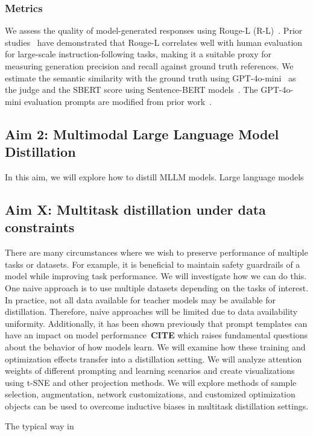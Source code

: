 \subsubsection{Metrics}
We assess the quality of model-generated responses using Rouge-L (R-L)~\cite{lin2004rouge}. 
Prior studies~\cite{wang2022super} have demonstrated that Rouge-L correlates well with human evaluation for large-scale instruction-following tasks, making it a suitable proxy for measuring generation precision and recall against ground truth references.
We estimate the semantic similarity with the ground truth using GPT-4o-mini~\cite{hurst2024gpt} as the judge and the SBERT score using Sentence-BERT models~\cite{reimers2019sentence}.
The GPT-4o-mini evaluation prompts are modified from prior work~\cite{zheng2023judging}.

\subsection{Aim 2: Multimodal Large Language Model Distillation}
In this aim, we will explore how to distill MLLM models. Large language models 

\subsection{Aim X: Multitask distillation under data constraints}
There are many circumstances where we wish to preserve performance of multiple tasks or datasets. For example, it is beneficial to maintain safety guardrails of a model while improving task performance. We will investigate how we can do this. One naive approach is to use multiple datasets depending on the tasks of interest. In practice, not all data available for teacher models may be available for distillation. Therefore, naive approaches will be limited due to data availability uniformity. Additionally, it has been shown previously that prompt templates can have an impact on model performance~\textbf{CITE} which raises fundamental questions about the behavior of how models learn. We will examine how these training and optimization effects transfer into a distillation setting. We will analyze attention weights of different prompting and learning scenarios and create visualizations using t-SNE and other projection methods. We will explore methods of sample selection, augmentation, network customizations, and customized optimization objects can be used to overcome inductive biases in multitask distillation settings. 

The typical way in 

